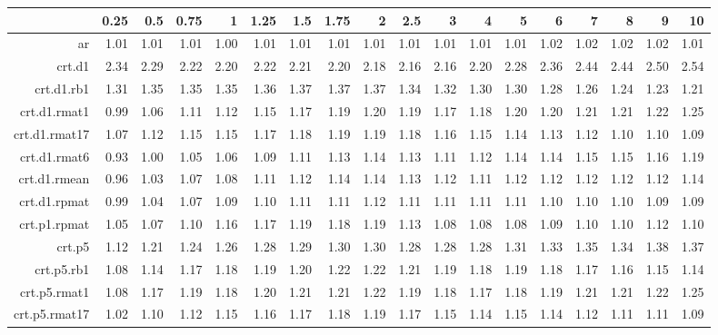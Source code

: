\begin{tabular}{rrrrrrrrrrrrrrrrrr}
  \hline
 & 0.25 & 0.5 & 0.75 & 1 & 1.25 & 1.5 & 1.75 & 2 & 2.5 & 3 & 4 & 5 & 6 & 7 & 8 & 9 & 10 \\ 
  \hline
ar & 1.01 & 1.01 & 1.01 & 1.00 & 1.01 & 1.01 & 1.01 & 1.01 & 1.01 & 1.01 & 1.01 & 1.01 & 1.02 & 1.02 & 1.02 & 1.02 & 1.01 \\ 
  crt.d1 & 2.34 & 2.29 & 2.22 & 2.20 & 2.22 & 2.21 & 2.20 & 2.18 & 2.16 & 2.16 & 2.20 & 2.28 & 2.36 & 2.44 & 2.44 & 2.50 & 2.54 \\ 
  crt.d1.rb1 & 1.31 & 1.35 & 1.35 & 1.35 & 1.36 & 1.37 & 1.37 & 1.37 & 1.34 & 1.32 & 1.30 & 1.30 & 1.28 & 1.26 & 1.24 & 1.23 & 1.21 \\ 
  crt.d1.rmat1 & 0.99 & 1.06 & 1.11 & 1.12 & 1.15 & 1.17 & 1.19 & 1.20 & 1.19 & 1.17 & 1.18 & 1.20 & 1.20 & 1.21 & 1.21 & 1.22 & 1.25 \\ 
  crt.d1.rmat17 & 1.07 & 1.12 & 1.15 & 1.15 & 1.17 & 1.18 & 1.19 & 1.19 & 1.18 & 1.16 & 1.15 & 1.14 & 1.13 & 1.12 & 1.10 & 1.10 & 1.09 \\ 
  crt.d1.rmat6 & 0.93 & 1.00 & 1.05 & 1.06 & 1.09 & 1.11 & 1.13 & 1.14 & 1.13 & 1.11 & 1.12 & 1.14 & 1.14 & 1.15 & 1.15 & 1.16 & 1.19 \\ 
  crt.d1.rmean & 0.96 & 1.03 & 1.07 & 1.08 & 1.11 & 1.12 & 1.14 & 1.14 & 1.13 & 1.12 & 1.11 & 1.12 & 1.12 & 1.12 & 1.12 & 1.12 & 1.14 \\ 
  crt.d1.rpmat & 0.99 & 1.04 & 1.07 & 1.09 & 1.10 & 1.11 & 1.11 & 1.12 & 1.11 & 1.11 & 1.11 & 1.11 & 1.10 & 1.10 & 1.10 & 1.09 & 1.09 \\ 
  crt.p1.rpmat & 1.05 & 1.07 & 1.10 & 1.16 & 1.17 & 1.19 & 1.18 & 1.19 & 1.13 & 1.08 & 1.08 & 1.08 & 1.09 & 1.10 & 1.10 & 1.12 & 1.10 \\ 
  crt.p5 & 1.12 & 1.21 & 1.24 & 1.26 & 1.28 & 1.29 & 1.30 & 1.30 & 1.28 & 1.28 & 1.28 & 1.31 & 1.33 & 1.35 & 1.34 & 1.38 & 1.37 \\ 
  crt.p5.rb1 & 1.08 & 1.14 & 1.17 & 1.18 & 1.19 & 1.20 & 1.22 & 1.22 & 1.21 & 1.19 & 1.18 & 1.19 & 1.18 & 1.17 & 1.16 & 1.15 & 1.14 \\ 
  crt.p5.rmat1 & 1.08 & 1.17 & 1.19 & 1.18 & 1.20 & 1.21 & 1.21 & 1.22 & 1.19 & 1.18 & 1.17 & 1.18 & 1.19 & 1.21 & 1.21 & 1.22 & 1.25 \\ 
  crt.p5.rmat17 & 1.02 & 1.10 & 1.12 & 1.15 & 1.16 & 1.17 & 1.18 & 1.19 & 1.17 & 1.15 & 1.14 & 1.15 & 1.14 & 1.12 & 1.11 & 1.11 & 1.09 \\ 

\end{tabular}
